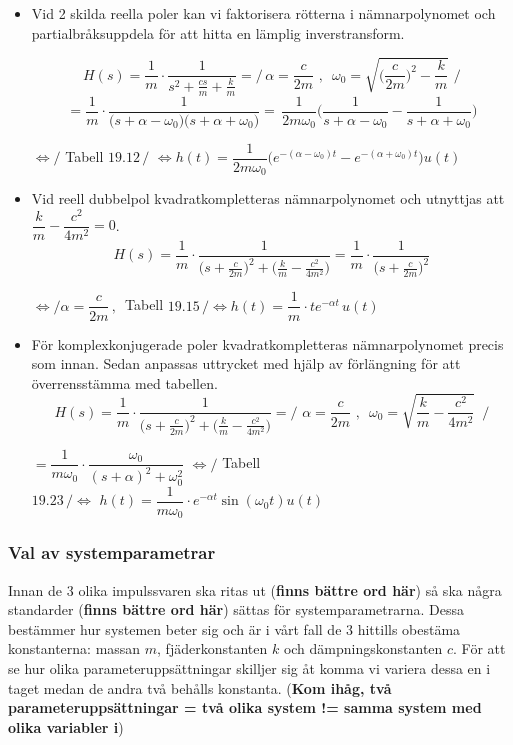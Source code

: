 \begin{itemize}
    \item Vid 2 skilda reella poler kan vi faktorisera rötterna i nämnarpolynomet och partialbråksuppdela för att hitta en lämplig inverstransform.
    
    $$H(s)=\frac{1}{m} \cdot \frac{1}{s^2+\frac{cs}{m}+\frac{k}{m}}=\Bigg/ \,\alpha=\frac{c}{2m}\,\,,\,\,\, \omega_0=\sqrt{\bigg(\frac{c}{2m}\bigg)^2-\frac{k}{m}} \,\,\Bigg/$$
    $$=\frac{1}{m} \cdot \frac{1}{\big(s+\alpha-\omega_0\big)\big(s+\alpha+\omega_0\big)}  = \, \frac{1}{2m\omega_0} \Bigg(\frac{1}{s+\alpha-\omega_0}-\frac{1}{s+\alpha+\omega_0}\Bigg)$$
    \begin{center}$ \Longleftrightarrow \bigg/$ Tabell $19.12\,\bigg/$ 
    $\Longleftrightarrow h(t)=\dfrac{1}{2m\omega_0}\bigg(e^{-(\alpha-\omega_0)t}-e^{-(\alpha+\omega_0)t}\bigg)u(t)$ \end{center}
    
    \item Vid reell dubbelpol kvadratkompletteras nämnarpolynomet och utnyttjas att
    $\dfrac{k}{m}-\dfrac{c^2}{4m^2}=0$.
    $$ H(s)= \frac{1}{m} \cdot\frac{1}{\big(s+\frac{c}{2m}\big)^2+\big(\frac{k}{m}-\frac{c^2}{4m^2}\big)} = \frac{1}{m} \cdot \frac{1}{\big(s+\frac{c}{2m}\big)^2}$$
    \begin{center}
    $ \Longleftrightarrow \bigg/ \alpha=\dfrac{c}{2m}\,,\,$ Tabell $19.15\,\bigg/ \Longleftrightarrow h(t)=\dfrac{1}{m} \cdot te^{-\alpha t}\,u(t)$
    \end{center}
    
    \item För komplexkonjugerade poler kvadratkompletteras nämnarpolynomet precis som innan. Sedan anpassas uttrycket med hjälp av förlängning för att överrensstämma med tabellen.
    $$H(s)=\frac{1}{m} \cdot \frac{1}{\big(s+\frac{c}{2m}\big)^2+\big(\frac{k}{m}-\frac{c^2}{4m^2}\big)} = \Bigg/\, \,\alpha=\frac{c}{2m}\,\,,\,\,\,\omega_0=\sqrt{\frac{k}{m}-\frac{c^2}{4m^2}} \,\,\,\Bigg/ $$
    \begin{center}
    $=\dfrac{1}{m\omega_0} \cdot \dfrac{\omega_0}{(s+\alpha)^2+\omega_0^2} \,\,\Longleftrightarrow \bigg/$ Tabell $19.23\,\bigg/\Longleftrightarrow\,\, h(t)=\dfrac{1}{m\omega_0} \cdot e^{-\alpha t} \sin(\omega_0 t)u(t)$
    \end{center}
\end{itemize}

\subsubsection{Val av systemparametrar}
Innan de 3 olika impulssvaren ska ritas ut (\textbf{finns bättre ord här}) så ska några standarder (\textbf{finns bättre ord här}) sättas för systemparametrarna. Dessa bestämmer hur systemen beter sig och är i vårt fall de 3 hittills obestäma konstanterna: massan  $m$, fjäderkonstanten $k$ och dämpningskonstanten $c$. För att se hur olika parameteruppsättningar skilljer sig åt komma vi variera dessa en i taget medan de andra två behålls konstanta. (\textbf{Kom ihåg, två parameteruppsättningar = två olika system != samma system med olika variabler i})


